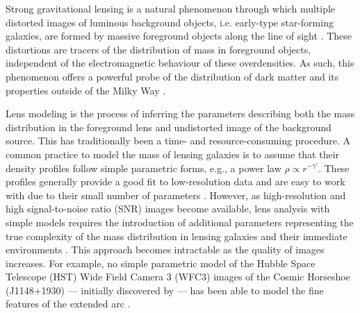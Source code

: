 Strong gravitational lensing is a natural phenomenon through which multiple distorted images of luminous background objects, 
i.e. early-type star-forming galaxies, are formed by massive foreground objects along the line of sight 
\citep[e.g.,][]{Viera2013,Marrone2018,Rizzo2020,Sun2021}. 
These distortions are tracers of the distribution of mass in foreground objects, independent of the electromagnetic behaviour of these overdensities. 
As such, this phenomenon offers a powerful probe of the distribution of 
dark matter and its properties outside of the Milky Way \citep[e.g.,][]{Dala2002,Treu2004,Hezaveh2016,Gilman2020,Gilman2021}.

Lens modeling is the process of inferring the parameters describing both the mass distribution in the 
foreground lens and undistorted image of the background source.
This has traditionally been a time- and resource-consuming procedure. 
A common practice to model the mass of lensing galaxies is 
to assume that their density profiles 
follow simple parametric forms, e.g., a power law $\rho \propto r^{-\gamma'}$. 
These profiles generally provide a good fit to low-resolution data and are easy to work with due to their small number of parameters \citep[e.g.,][]{Koopmans2006,Barnabe2009,Auger2010}. 
However, as high-resolution and high signal-to-noise ratio (SNR) images become available, lens analysis with simple models requires the introduction of additional parameters representing the true complexity of the mass distribution in lensing galaxies and their immediate environments \citep[e.g.,][]{Sluse2017,Wong2017,Birrer2019,Rusu2019, Rusu2017,Li2021}. 
This approach becomes intractable as the quality of images increases. For example,
no simple parametric model of the Hubble Space Telescope (HST) Wide Field Camera 3 (WFC3) images of 
the Cosmic Horseshoe (J1148+1930) --- initially discovered by \citet{Belokurov2007} --- 
has been able to model the fine features of the extended arc 
\citep[e.g., ][]{Bellagamba2016,James2018,Cheng2019,Schuldt2019}.

